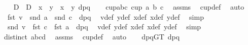 \begin{isabellebody}
\ \ \isamarkupfalse%
\ D\ \ {\isachardoublequoteopen}D\ {\isasymequiv}\ {\isacharparenleft}{\kern0pt}x{}\ {\isacharasterisk}{\kern0pt}\ y{}\ {\isacharminus}{\kern0pt}\ x{}\ {\isacharasterisk}{\kern0pt}\ y{}{\isacharparenright}{\kern0pt}{\isacharslash}{\kern0pt}\ dpq{\isachardoublequoteclose}\isanewline
\isanewline
\ \ \isamarkupfalse%
\ cup{\isacharunderscore}{\kern0pt}abc{\isacharcolon}{\kern0pt}\ {\isachardoublequoteopen}cup{}\ a\ b\ c{\isachardoublequoteclose}\ \isamarkupfalse%
\ assms\ \isamarkupfalse%
\ cup{\isacharunderscore}{\kern0pt}def\ \isamarkupfalse%
\ auto\isanewline
\ \ \isamarkupfalse%
\ {}{\isacharcolon}{\kern0pt}\ {\isachardoublequoteopen}fst\ v\ {\isacharequal}{\kern0pt}\ {\isacharparenleft}{\kern0pt}snd\ a\ {\isacharminus}{\kern0pt}\ snd\ c{\isacharparenright}{\kern0pt}\ {\isacharslash}{\kern0pt}\ dpq{\isachardoublequoteclose}\ \isamarkupfalse%
\ v{\isacharunderscore}{\kern0pt}def\ y{}{\isacharunderscore}{\kern0pt}def\ x{}{\isacharunderscore}{\kern0pt}def\ x{}{\isacharunderscore}{\kern0pt}def\ y{}{\isacharunderscore}{\kern0pt}def\ \isamarkupfalse%
\ simp\isanewline
\ \ \isamarkupfalse%
\ {}{\isacharcolon}{\kern0pt}\ {\isachardoublequoteopen}snd\ v\ {\isacharequal}{\kern0pt}\ {\isacharparenleft}{\kern0pt}fst\ c\ {\isacharminus}{\kern0pt}\ fst\ a{\isacharparenright}{\kern0pt}\ {\isacharslash}{\kern0pt}\ dpq{\isachardoublequoteclose}\ \isamarkupfalse%
\ v{\isacharunderscore}{\kern0pt}def\ y{}{\isacharunderscore}{\kern0pt}def\ x{}{\isacharunderscore}{\kern0pt}def\ x{}{\isacharunderscore}{\kern0pt}def\ y{}{\isacharunderscore}{\kern0pt}def\ \isamarkupfalse%
\ simp\ \isanewline
\ \ \isamarkupfalse%
\ {\isachardoublequoteopen}distinct\ {\isacharbrackleft}{\kern0pt}a{\isacharcomma}{\kern0pt}b{\isacharcomma}{\kern0pt}c{\isacharcomma}{\kern0pt}d{\isacharbrackright}{\kern0pt}{\isachardoublequoteclose}\ \isamarkupfalse%
\ assms\ \isamarkupfalse%
\ cup{\isacharunderscore}{\kern0pt}def\ \isamarkupfalse%
\ auto\isanewline
\ \ \isamarkupfalse%
\ dpqGT{}{\isacharcolon}{\kern0pt}\ {\isachardoublequoteopen}dpq\ {\isachargreater}{\kern0pt}\ {}{\isachardoublequoteclose}\ \isamarkupfalse%

\end{isabellebody}
